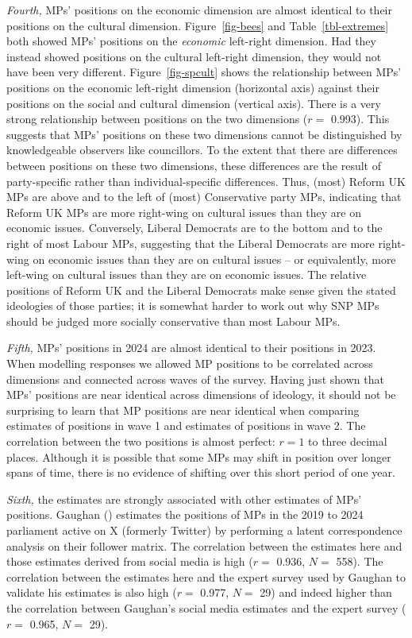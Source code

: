 \documentclass[
]{article}
\begin{document}
\emph{Fourth,} MPs' positions on the economic dimension are almost
identical to their positions on the cultural dimension.
Figure~\ref{fig-bees} and Table~\ref{tbl-extremes} both showed MPs'
positions on the \emph{economic} left-right dimension. Had they instead
showed positions on the cultural left-right dimension, they would not
have been very different. Figure~\ref{fig-spcult} shows the relationship
between MPs' positions on the economic left-right dimension (horizontal
axis) against their positions on the social and cultural dimension
(vertical axis). There is a very strong relationship between positions
on the two dimensions (\(r=\) 0.993). This suggests that MPs' positions
on these two dimensions cannot be distinguished by knowledgeable
observers like councillors. To the extent that there are differences
between positions on these two dimensions, these differences are the
result of party-specific rather than individual-specific differences.
Thus, (most) Reform UK MPs are above and to the left of (most)
Conservative party MPs, indicating that Reform UK MPs are more
right-wing on cultural issues than they are on economic issues.
Conversely, Liberal Democrats are to the bottom and to the right of most
Labour MPs, suggesting that the Liberal Democrats are more right-wing on
economic issues than they are on cultural issues -- or equivalently,
more left-wing on cultural issues than they are on economic issues. The
relative positions of Reform UK and the Liberal Democrats make sense
given the stated ideologies of those parties; it is somewhat harder to
work out why SNP MPs should be judged more socially conservative than
most Labour MPs.

\emph{Fifth,} MPs' positions in 2024 are almost identical to their
positions in 2023. When modelling responses we allowed MP positions to
be correlated across dimensions and connected across waves of the
survey. Having just shown that MPs' positions are near identical across
dimensions of ideology, it should not be surprising to learn that MP
positions are near identical when comparing estimates of positions in
wave 1 and estimates of positions in wave 2. The correlation between the
two positions is almost perfect: \(r=1\) to three decimal places.
Although it is possible that some MPs may shift in position over longer
spans of time, there is no evidence of shifting over this short period
of one year.

\emph{Sixth,} the estimates are strongly associated with other estimates
of MPs' positions. Gaughan ()
estimates the positions of MPs in the 2019 to 2024 parliament active on
X (formerly Twitter) by performing a latent correspondence analysis on
their follower matrix. The correlation between the estimates here and
those estimates derived from social media is high (\(r=\) 0.936, \(N=\)
558). The correlation between the estimates here and the expert survey
used by Gaughan to validate his estimates is also high (\(r=\) 0.977,
\(N=\) 29) and indeed higher than the correlation between Gaughan's
social media estimates and the expert survey (\(r=\) 0.965, \(N=\) 29).
\end{document}
